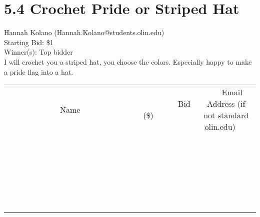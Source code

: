 \documentclass[11pt]{article}
\begin{document}
					\section*{5.4 Crochet Pride or Striped Hat}
					Hannah Kolano (Hannah.Kolano@students.olin.edu) \\
					Starting Bid: \$1 \\
					Winner(s): Top bidder \\
					I will crochet you a striped hat, you choose the colors. Especially happy to make a pride flag into a hat. \\
					[6ex]
					\begin{tabular}{c c c}
						~~~~~~~~~~~~~Name~~~~~~~~~~~~~ & ~~~~~~~~~Bid (\$)~~~~~~~~~ & ~~~Email Address (if not standard olin.edu)~~~ \\
				
 & & \\
\hline
 & & \\
\hline
 & & \\
\hline
 & & \\
\hline
 & & \\
\hline
 & & \\
\hline
 & & \\
\hline
 & & \\
\hline
 & & \\
\hline
 & & \\
\hline
 & & \\
\hline
 & & \\
\hline
 & & \\
\hline
 & & \\
\hline
 & & \\
\hline
 & & \\
\hline
 & & \\
\hline
 & & \\
\hline
 & & \\
\hline
 & & \\
\hline
 & & \\
\hline
 & & \\
\hline
 & & \\
\hline
 & & \\
\hline
 & & \\
\hline
 & & \\
\hline
					\end{tabular}
					\clearpage
				
\end{document}
